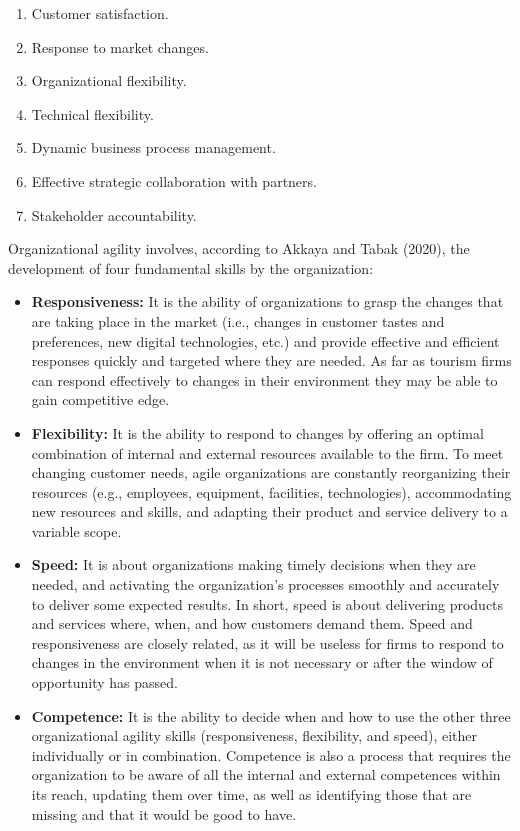 \documentclass[
  letterpaper,
  DIV=11,
  numbers=noendperiod]{scrreprt}
\providecommand{\tightlist}{%
  \setlength{\itemsep}{0pt}\setlength{\parskip}{0pt}}\usepackage{longtable,booktabs,array}
\begin{document}
\begin{enumerate}
\def\labelenumi{\arabic{enumi}.}
\item
  Customer satisfaction.
\item
  Response to market changes.
\item
  Organizational flexibility.
\item
  Technical flexibility.
\item
  Dynamic business process management.
\item
  Effective strategic collaboration with partners.
\item
  Stakeholder accountability.
\end{enumerate}

Organizational agility involves, according to Akkaya and Tabak (2020),
the development of four fundamental skills by the organization:

\begin{itemize}
\tightlist
\item
  \textbf{Responsiveness:} It is the ability of organizations to grasp
  the changes that are taking place in the market (i.e., changes in
  customer tastes and preferences, new digital technologies, etc.) and
  provide effective and efficient responses quickly and targeted where
  they are needed. As far as tourism firms can respond effectively to
  changes in their environment they may be able to gain competitive
  edge.
\item
  \textbf{Flexibility:} It is the ability to respond to changes by
  offering an optimal combination of internal and external resources
  available to the firm. To meet changing customer needs, agile
  organizations are constantly reorganizing their resources (e.g.,
  employees, equipment, facilities, technologies), accommodating new
  resources and skills, and adapting their product and service delivery
  to a variable scope.
\item
  \textbf{Speed:} It is about organizations making timely decisions when
  they are needed, and activating the organization's processes smoothly
  and accurately to deliver some expected results. In short, speed is
  about delivering products and services where, when, and how customers
  demand them. Speed and responsiveness are closely related, as it will
  be useless for firms to respond to changes in the environment when it
  is not necessary or after the window of opportunity has passed.
\item
  \textbf{Competence:} It is the ability to decide when and how to use
  the other three organizational agility skills (responsiveness,
  flexibility, and speed), either individually or in combination.
  Competence is also a process that requires the organization to be
  aware of all the internal and external competences within its reach,
  updating them over time, as well as identifying those that are missing
  and that it would be good to have.
\end{itemize}
\end{document}
